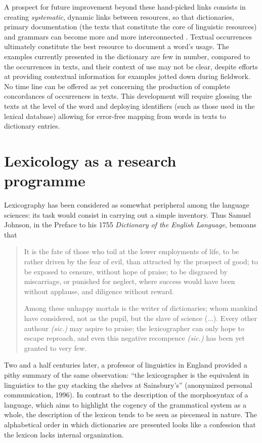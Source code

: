 A prospect for future improvement beyond these hand-picked links consists in creating \emph{systematic}, dynamic links between resources, so that dictionaries, primary documentation (the texts that constitute the core of linguistic resources) and grammars can become more and more interconnected \parencite{maxwell2012}. Textual occurrences ultimately constitute the best resource to document a word’s usage. The examples currently presented in the dictionary are few in number, compared to the occurrences in texts, and their context of use may not be clear, despite efforts at providing contextual information for examples jotted down during fieldwork. No time line can be offered as yet concerning the production of complete concordances of occurrences in texts. This development will require glossing the texts at the level of the word and deploying identifiers (such as those used in the lexical database) allowing for error-free mapping from words in texts to dictionary entries.



\section{Lexicology as a research programme}
\label{sec:recherche}

Lexicography has been considered as somewhat peripheral among the language sciences: its task would consist in carrying out a simple inventory. Thus Samuel Johnson, in the Preface to his 1755 \emph{Dictionary of the English Language}, bemoans that

\begin{quotation}
    It is the fate of those who toil at the lower employments of life, to be rather driven by the fear of evil, than attracted by the prospect of good; to be exposed to censure, without hope of praise; to be disgraced by miscarriage, or punished for neglect, where success would have been without applause, and diligence without reward.

    Among these unhappy mortals is the writer of dictionaries; whom mankind have considered, not as the pupil, but the slave of science (...). Every other authour \emph{(sic.)} may aspire to praise; the lexicographer can only hope to escape reproach, and even this negative recompence \emph{(sic.)} has been yet granted to very few.
\end{quotation}

Two and a half centuries later, a professor of linguistics in England provided a pithy summary of the same observation: “the lexicographer is the equivalent in linguistics to the guy stacking the shelves at Sainsbury’s” (anonymized personal communication, 1996). In contrast to the description of the morphosyntax of a language, which aims to highlight the cogency of the grammatical system as a whole, the description of the lexicon tends to be seen as piecemeal in nature. The alphabetical order in which dictionaries are presented looks like a confession that the lexicon lacks internal organization.

